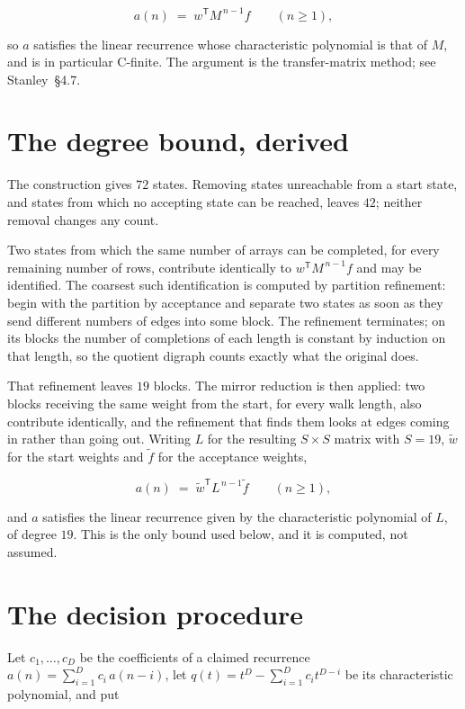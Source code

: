 \documentclass[11pt]{article}
\theoremstyle{definition}
\begin{document}
\[a(n) \;=\; w^{\mathsf T} M^{\,n-1} f \qquad (n \ge 1),\]

so $a$ satisfies the linear recurrence whose characteristic polynomial is that of $M$, and is in particular C-finite. The argument is the transfer-matrix method; see Stanley~\S4.7.

\section{The degree bound, derived}

The construction gives $72$ states. Removing states unreachable from a start state, and states from which no accepting state can be reached, leaves $42$; neither removal changes any count.

Two states from which the same number of arrays can be completed, for every remaining number of rows, contribute identically to $w^{\mathsf T}M^{\,n-1}f$ and may be identified. The coarsest such identification is computed by partition refinement: begin with the partition by acceptance and separate two states as soon as they send different numbers of edges into some block. The refinement terminates; on its blocks the number of completions of each length is constant by induction on that length, so the quotient digraph counts exactly what the original does.

That refinement leaves $19$ blocks. The mirror reduction is then applied: two blocks receiving the same weight from the start, for every walk length, also contribute identically, and the refinement that finds them looks at edges coming in rather than going out. Writing $L$ for the resulting $S \times S$ matrix with $S = 19$, $\tilde w$ for the start weights and $\tilde f$ for the acceptance weights,

\[a(n) \;=\; \tilde w^{\mathsf T} L^{\,n-1} \tilde f \qquad (n \ge 1),\]

and $a$ satisfies the linear recurrence given by the characteristic polynomial of $L$, of degree $19$. This is the only bound used below, and it is computed, not assumed.

\section{The decision procedure}

Let $c_1,\dots,c_D$ be the coefficients of a claimed recurrence $a(n) = \sum_{i=1}^{D} c_i\,a(n-i)$, let $q(t) = t^{D} - \sum_{i=1}^{D} c_i t^{D-i}$ be its characteristic polynomial, and put
\end{document}
